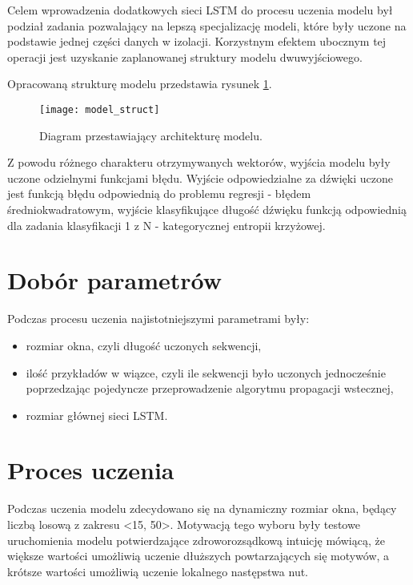 {{        Celem wprowadzenia dodatkowych sieci LSTM do procesu uczenia modelu był podział zadania pozwalający na lepszą specjalizację modeli, które były uczone na podstawie jednej części danych w izolacji. Korzystnym efektem ubocznym tej operacji jest uzyskanie zaplanowanej struktury modelu dwuwyjściowego.

        Opracowaną strukturę modelu przedstawia rysunek \ref{model_struct}.
        
        \begin{figure}[H]
            \centering
            \texttt{[image: model\_struct]}
            \caption{Diagram przestawiający architekturę modelu.}
            \label{model_struct}
        \end{figure}

        Z powodu różnego charakteru otrzymywanych wektorów, wyjścia modelu były uczone odzielnymi funkcjami błędu. 
        Wyjście odpowiedzialne za dźwięki uczone jest funkcją błędu odpowiednią do problemu 
        regresji - błędem średniokwadratowym, wyjście klasyfikujące długość dźwięku funkcją odpowiednią
        dla zadania klasyfikacji  1\,\,z\,\,N - kategorycznej entropii krzyżowej.
    }

    \newpage

    \section{Dobór parametrów}
    {
        Podczas procesu uczenia najistotniejszymi parametrami były:
        \begin{itemize}
            \setlength\itemsep{-0.5em}
            \item rozmiar okna, czyli długość uczonych sekwencji,
            \item ilość przykładów w wiązce, czyli ile sekwencji było uczonych jednocześnie
            poprzedzając pojedyncze przeprowadzenie algorytmu propagacji wstecznej,
            \item rozmiar głównej sieci LSTM.
        \end{itemize}
    }

    \section{Proces uczenia}
    {
        Podczas uczenia modelu zdecydowano się na dynamiczny rozmiar okna,
        będący liczbą losową z zakresu <15, 50>. Motywacją tego wyboru były testowe 
        uruchomienia modelu potwierdzające zdroworozsądkową intuicję mówiącą, że większe wartości
        umożliwią uczenie dłuższych powtarzających się motywów, a krótsze wartości umożliwią uczenie lokalnego następstwa nut.

}}
